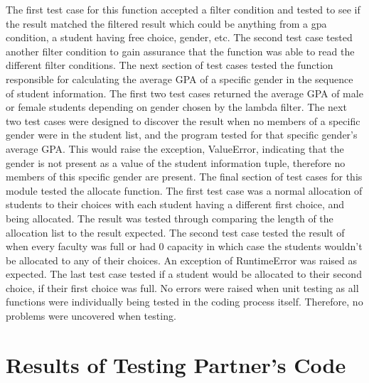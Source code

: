 \documentclass[12pt]{article}
\begin{document}
The first test case for this function accepted a filter condition and tested to see if the result matched the filtered result which could be anything from a gpa condition, a student having free choice, gender, etc. The second test case
tested another filter condition to gain assurance that the function was able to read the different filter conditions. The next section of test cases tested the function responsible 
for calculating the average GPA of a specific gender in the sequence of student information. The first two test cases returned the average GPA of male or female students depending on gender chosen by the lambda filter. The next two test cases were designed 
to discover the result when no members of a specific gender were in the student list, and the program tested for that specific gender's average GPA. This would raise the exception, ValueError, indicating that the gender is not present as a value of the student
information tuple, therefore no members of this specific gender are present. The final section of test cases for this module tested the allocate function. The first test case was a normal allocation of students to their choices with each student having a different first
choice, and being allocated. The result was tested through comparing the length of the allocation list to the result expected. The second test case tested the result of when every faculty was full or had 0 capacity in which
case the students wouldn't be allocated to any of their choices. An exception of RuntimeError was raised as expected. The last test case tested if a student would be allocated to their second choice, if their first choice was full. 
No errors were raised when unit testing as all functions were individually being tested in the coding process itself. Therefore, no problems were uncovered when testing.

\section{Results of Testing Partner's Code}
\end{document}
